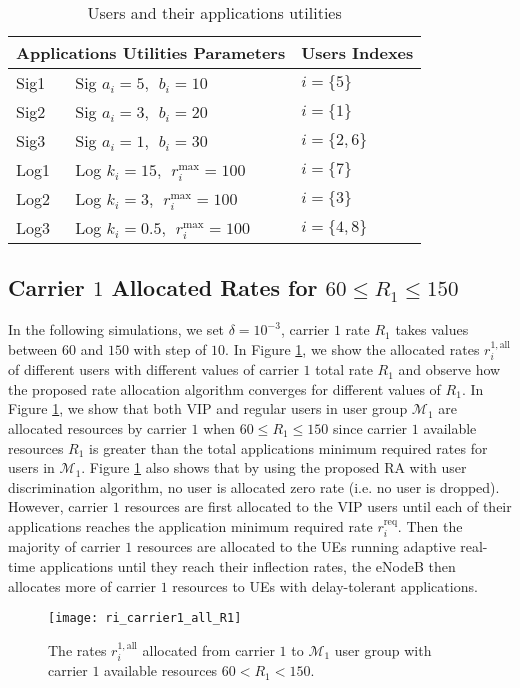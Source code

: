 \documentclass[journal]{IEEEtran} 				\IEEEoverridecommandlockouts 						\usepackage{amsmath,amssymb}
\begin{document}
\begin {table}[]
\caption {Users and their applications utilities}
\label{table:parameters}
\begin{center}
\renewcommand{\arraystretch}{1.4} \begin{tabular}{| l | l | l | }
\hline
  \multicolumn{2}{|c|}{Applications Utilities Parameters} & \multicolumn{1}{|c|}{Users Indexes} \\  \hline
  Sig1 & Sig $a_i=5,\:\: b_i=10$  &  $i=\{5\}$ \\ \hline
  Sig2 & Sig $a_i=3,\:\: b_i=20$ & $i=\{1\}$  \\ \hline
  Sig3 & Sig $a_i=1,\:\: b_i=30$ & $i=\{2,6\}$   \\ \hline
  Log1 & Log $k_i=15,\:\: r_i^{\text{max}}=100$ & $i=\{7\}$   \\ \hline
  Log2 & Log $k_i=3,\:\: r_i^{\text{max}}=100$ & $i=\{3\}$   \\ \hline
  Log3 & Log $k_i=0.5,\:\: r_i^{\text{max}}=100$ & $i=\{4,8\}$ \\ \hline
\end{tabular}
\end{center}
\end {table}
\subsection{Carrier $1$ Allocated Rates for $60\le R_1 \le 150$}
In the following simulations, we set $\delta =10^{-3}$, carrier $1$ rate $R_1$ takes values between $60$ and $150$ with step of $10$. In Figure \ref{fig:ri_carrier1_all_R1}, we show the allocated rates $r_i^{1,\text{all}}$ of different users with different values of carrier $1$ total rate $R_1$ and observe how the proposed rate allocation algorithm converges for different values of $R_1$. In Figure \ref{fig:ri_carrier1_all_R1}, we show that both VIP and regular users in user group $\mathcal{M}_1$ are allocated resources by carrier $1$ when $60\le R_1 \le 150$ since carrier $1$ available resources $R_1$ is greater than the total applications minimum required rates for users in $\mathcal{M}_1$. Figure \ref{fig:ri_carrier1_all_R1} also shows that by using the proposed RA with user discrimination algorithm, no user is allocated zero rate (i.e. no user is dropped). However, carrier $1$ resources are first allocated to the VIP users until each of their applications reaches the application minimum required rate $r_i^{\text{req}}$. Then the majority of carrier $1$ resources are allocated to the UEs running adaptive real-time applications until they reach their inflection rates, the eNodeB then allocates more of carrier $1$ resources to UEs with delay-tolerant applications.
\begin{figure}[tb]
\centering
\texttt{[image: ri\_carrier1\_all\_R1]}
\caption{The rates $r_i^{1,\text{all}}$ allocated from carrier $1$ to $\mathcal{M}_1$ user group with carrier $1$ available resources $60<R_1<150$.}
\label{fig:ri_carrier1_all_R1}
\end{figure}
\end{document}
